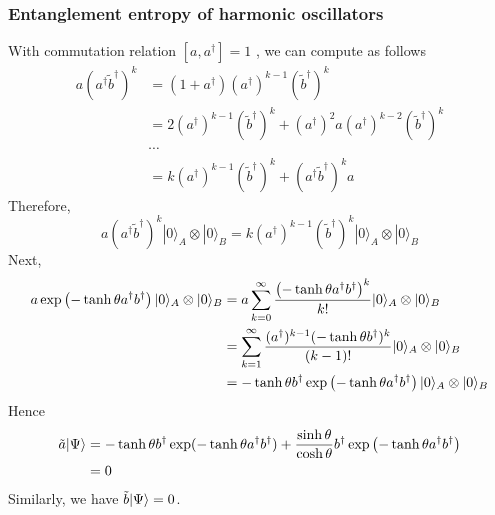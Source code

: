 \subsubsection{Entanglement entropy of harmonic oscillators}
With commutation relation $[a, a^{\dag}]=1$ , we can compute as follows
\begin{equation}
	\begin{split}
	a(a^{\dagger}\tilde{b}^{\dagger})^k &= (1+ a^{\dagger})(a^{\dagger})^{k-1}(\tilde{b}^{\dagger})^{k} \\
	&= 2(a^{\dagger})^{k-1}(\tilde{b}^{\dagger})^{k} + (a^{\dagger})^2 a(a^{\dagger})^{k-2}(\tilde{b}^{\dagger})^k\\
	& \cdots\\
	&= k (a^{\dagger})^{k-1}(\tilde{b}^{\dagger})^{k} + (a^{\dagger} \tilde{b}^{\dagger})^{k} a
	\end{split}
\end{equation}
Therefore,
\begin{equation}
	a(a^{\dagger}\tilde{b}^{\dagger})^k |0\rangle_A \otimes |0\rangle_B = k(a^{\dagger})^{k-1} (\tilde{b}^{\dagger})^{k} |0 \rangle_A \otimes |0 \rangle_B
\end{equation}
Next, 
\begin{equation}
	\begin{split}
	a \exp\left(-\tanh \theta a^{\dagger} b^{\dagger} \right) | 0 \rangle_A \otimes | 0 \rangle_B  &= a \sum_{k=0}^{\infty} \frac{\left(-\tanh \theta a^{\dagger} b^{\dagger} \right)^k}{k!} | 0 \rangle_A \otimes | 0 \rangle_B \\
	& =\sum_{k=1}^{\infty} \frac{(a^{\dagger})^{k-1}(-\tanh \theta b^{\dagger})^k }{(k-1)!}| 0 \rangle_A \otimes | 0 \rangle_B\\
	& = -\tanh\theta b^{\dagger}\exp\left(- \tanh\theta a^{\dagger}b^{\dagger} \right) | 0 \rangle_A \otimes | 0 \rangle_B
	\end{split}
\end{equation}
Hence 
\begin{equation}
	\begin{split}
	\tilde{a} | \Psi \rangle & = - \tanh\theta b^{\dagger} \exp(-\tanh \theta a^{\dagger}b^{\dagger}) + \frac{\sinh \theta}{\cosh \theta} b^{\dagger} \exp\left(-\tanh\theta a^{\dagger} b^{\dagger} \right)\\
	&= 0
	\end{split}
\end{equation}
Similarly, we have $\tilde{b}| \Psi \rangle=0$.

